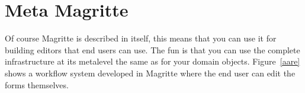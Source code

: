 \documentclass[a4paper,10pt,twoside]{book}
\begin{document}
% 
% 
% 
% 
% 
% 
% 
% 
% 
% 
% 
% 







% 


\section{Meta Magritte}
Of course Magritte is described in itself, this means that you can use it for building editors
that end users can use. The fun is that you can use the complete infrastructure at its metalevel the same as for your domain objects. Figure~\ref{aare} shows a workflow system developed in Magritte where the end user can edit the forms themselves. 
\end{document}
